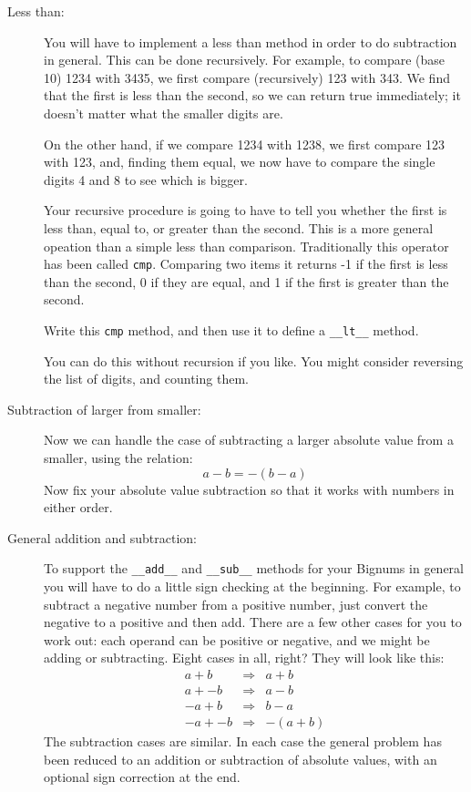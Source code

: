 \documentclass{article}
\begin{document}
\begin{description}
\item[Less than:]  You will have to implement a less than
method in order to do subtraction in general.  This can be
done recursively.  For example, to compare (base 10) 1234
with 3435, we first compare (recursively) 123 with 343.
We find that the first is less than the second, so we can return
true immediately; it doesn't matter what the smaller digits are.

On the other hand, if we compare 1234 with 1238, we first
compare 123 with 123, and, finding them equal, we now have
to compare the single digits 4 and 8 to see which is bigger.

Your recursive procedure is going to have to tell you whether the
first is less than, equal to, or greater than the second.  This is a 
more general opeation than a simple less than comparison.
Traditionally this operator has been called {\tt cmp}.  Comparing
two items it returns -1 if the first is less than the second, 0
if they are equal, and 1 if the first is greater than the second.

Write this  {\tt cmp} method, and then use it to
define a \lstinline{__lt__} method. 

You can do this without recursion if you like.  You might consider
reversing the list of digits, and counting them.

\item[Subtraction of larger from smaller:]
Now we can handle the case of subtracting a larger absolute value
from a smaller, using the relation:
\[
a - b = -(b - a)
\]
Now fix your absolute value subtraction so that it works 
with numbers in either order.

\item[General addition and subtraction:]  
 To support the \lstinline{__add__} and \lstinline{__sub__} methods
for your Bignums in general
you will have to do a little sign checking at the beginning.  For example,
to subtract a negative number from a positive number, just convert the negative
to a positive and then add. 
There are a few
other cases for you to work out: each operand can be positive or negative,
and we might be adding or subtracting.  Eight cases in all, right?  They 
will look like this:
\[
\begin{array}{rcl}
a + b & \Rightarrow & a + b \\
a + -b & \Rightarrow & a - b \\
-a + b &\Rightarrow& b - a \\
-a + -b &\Rightarrow& -(a+b)
\end{array}
\]
The subtraction cases are similar.  In each case the general problem
has been reduced to an addition or subtraction of absolute values,
with an optional sign correction at the end.


\end{description}
\end{document}
